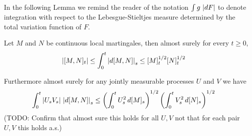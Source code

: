 In the following Lemma we remind the reader of the notation $\int g \, \left \vert dF \right \vert$ to denote integration with respect to the Lebesgue-Stieltjes measure determined by the total variation function of $F$.
\begin{lem}\label{CourregeCauchySchwartz}Let $M$ and $N$ be continuous local martingales, then almost surely for every $t \geq 0$, 
\begin{align}
\left \vert [M,N]_t \right \vert &\leq \int_0^t \left \vert d[M,N] \right \vert_s \leq [M]_t^{1/2} [N]_t^{1/2}
\label{CourregeCauchySchwartz1}\end{align}

Furthermore almost surely for any jointly measurable processes $U$ and $V$ we have 
\begin{align*}
\int_0^t \left \vert U_sV_s \right \vert \, \left \vert d[M,N] \right \vert_s &\leq \left(\int_0^t U_s^2 \, d[M]_s\right)^{1/2} \left(\int_0^t V_s^2 \, d[N]_s\right)^{1/2} 
\end{align*}
(TODO: Confirm that almost sure this holds for all $U,V$ not that for each pair $U,V$ this holds a.s.)
\end{lem}
